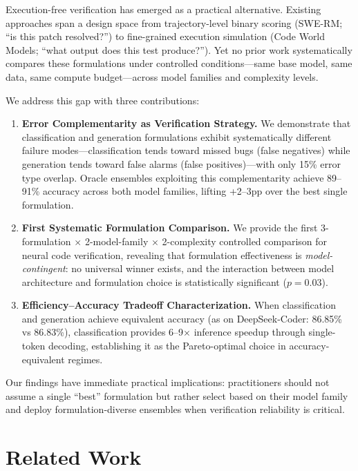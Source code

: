 \documentclass[11pt,a4paper]{article}
\begin{document}
Execution-free verification has emerged as a practical alternative. Existing approaches span a design space from trajectory-level binary scoring (SWE-RM; ``is this patch resolved?'') to fine-grained execution simulation (Code World Models; ``what output does this test produce?''). Yet no prior work systematically compares these formulations under controlled conditions---same base model, same data, same compute budget---across model families and complexity levels.

We address this gap with three contributions:

\begin{enumerate}
\item \textbf{Error Complementarity as Verification Strategy.} We demonstrate that classification and generation formulations exhibit systematically different failure modes---classification tends toward missed bugs (false negatives) while generation tends toward false alarms (false positives)---with only 15\% error type overlap. Oracle ensembles exploiting this complementarity achieve 89--91\% accuracy across both model families, lifting +2--3pp over the best single formulation.

\item \textbf{First Systematic Formulation Comparison.} We provide the first 3-formulation $\times$ 2-model-family $\times$ 2-complexity controlled comparison for neural code verification, revealing that formulation effectiveness is \emph{model-contingent}: no universal winner exists, and the interaction between model architecture and formulation choice is statistically significant ($p=0.03$).

\item \textbf{Efficiency--Accuracy Tradeoff Characterization.} When classification and generation achieve equivalent accuracy (as on DeepSeek-Coder: 86.85\% vs 86.83\%), classification provides 6--9$\times$ inference speedup through single-token decoding, establishing it as the Pareto-optimal choice in accuracy-equivalent regimes.
\end{enumerate}

Our findings have immediate practical implications: practitioners should not assume a single ``best'' formulation but rather select based on their model family and deploy formulation-diverse ensembles when verification reliability is critical.

\section{Related Work}
\end{document}
